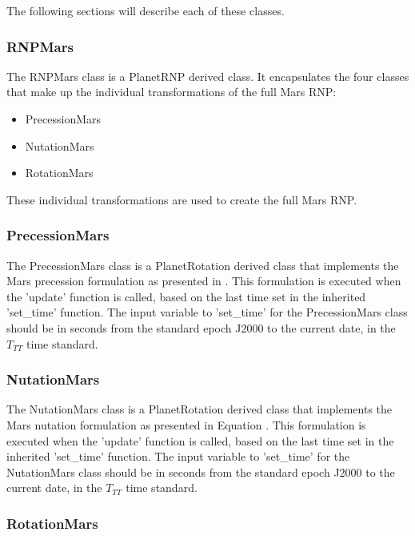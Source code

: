 The following sections will describe each of these classes.

\subsubsection{RNPMars}

The RNPMars class is a PlanetRNP derived class. It encapsulates the four
classes that make up the individual transformations of the full Mars RNP:

\begin{itemize}
\item{PrecessionMars}
\item{NutationMars}
\item{RotationMars}
\end{itemize}

These individual transformations are used to create the full Mars RNP.

\subsubsection{PrecessionMars}

The PrecessionMars class is a PlanetRotation derived class that implements the
Mars precession formulation as presented in \cite{Konopliv06}.
This formulation is executed when the 'update' function is called, based
on the last time set in the inherited 'set\_time' function. The input
variable to 'set\_time' for the PrecessionMars class should be in
seconds from the standard epoch J2000 to the current date, in the
$T_{TT}$ time standard.

\subsubsection{NutationMars}

The NutationMars class is a PlanetRotation derived class that implements the
Mars nutation formulation as presented in Equation \cite{Konopliv06}.
This formulation is executed when the 'update' function is called, based
on the last time set in the inherited 'set\_time' function. The input
variable to 'set\_time' for the NutationMars class should be in
seconds from the standard epoch J2000 to the current date, in the
$T_{TT}$ time standard.

\subsubsection{RotationMars}

